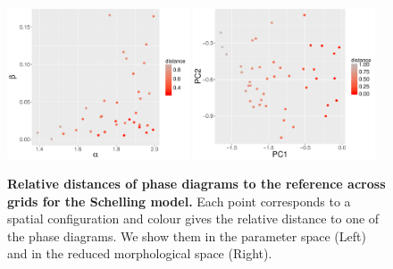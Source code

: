 \documentclass[preprint,5p,times,twocolumn,authoryear]{elsarticle}
\begin{document}
\begin{figure}[h!]
\centering
\includegraphics[width=0.48\textwidth]{figures/schelling-relativedistance_metaparams_red}
\includegraphics[width=0.48\textwidth]{figures/schelling-relativedistance_morphspace_red}
\caption{\textbf{Relative distances of phase diagrams to the reference across grids for the Schelling model.} Each point corresponds to a spatial configuration and colour gives the relative distance to one of the phase diagrams. We show them in the parameter space (Left) and in the reduced morphological space (Right).\label{fig:schelling-distance-meta}}
\end{figure}


\section{}
\label{app:code}

\end{document}
